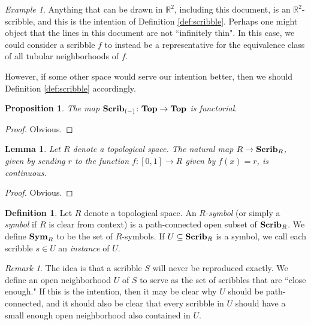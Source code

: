 \documentclass{amsart}
\def\to{\rightarrow}
\def\RR{{\mathbb R}}
\def\ss{\subseteq}
\def\taking{\colon}
\def\Top{{\bf Top}}
\def\Scrib{{\bf Scrib}}
\def\Sym{{\bf Sym}}
\newtheorem{lemma}[theorem]{Lemma}
\newtheorem{proposition}[theorem]{Proposition}
\theoremstyle{remark}
\newtheorem{remark}[theorem]{Remark}
\newtheorem{example}[theorem]{Example}
\theoremstyle{definition}
\newtheorem{definition}[theorem]{Definition}
\begin{document}
\begin{example}

Anything that can be drawn in $\RR^2$, including this document, is an $\RR^2$-scribble, and this is the intention of Definition \ref{def:scribble}. Perhaps one might object that the lines in this document are not ``infinitely thin". In this case, we could consider a scribble $f$ to instead be a representative for the equivalence class of all tubular neighborhoods of $f$.

However, if some other space would serve our intention better, then we should Definition \ref{def:scribble} accordingly.

\end{example}

\begin{proposition}

The map $\Scrib_{(-)}\taking\Top\to\Top$ is functorial.

\end{proposition}

\begin{proof}

Obvious.

\end{proof}

\begin{lemma}

Let $R$ denote a topological space. The natural map $R\to\Scrib_R$, given by sending $r$ to the function $f\taking [0,1]\to R$ given by $f(x)=r$, is continuous.

\end{lemma}

\begin{proof}

Obvious.

\end{proof}

\begin{definition}

Let $R$ denote a topological space. An {\em $R$-symbol} (or simply a {\em symbol} if $R$ is clear from context) is a path-connected open subset of $\Scrib_R$. We define $\Sym_R$ to be the set of $R$-symbols. If $U\ss\Scrib_R$ is a symbol, we call each scribble $s\in U$ an {\em instance} of $U$.

\end{definition}

\begin{remark}

The idea is that a scribble $S$ will never be reproduced exactly. We define an open neighborhood $U$ of $S$ to serve as the set of scribbles that are ``close enough." If this is the intention, then it may be clear why $U$ should be path-connected, and it should also be clear that every scribble in $U$ should have a small enough open neighborhood also contained in $U$.

\end{remark}
\end{document}
